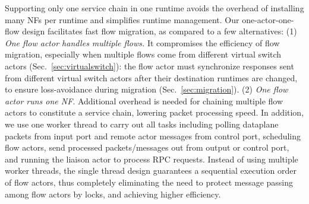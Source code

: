 




\vspace{1mm}
 Supporting only one service chain in one runtime avoids the overhead of installing many NFs per runtime and simplifies runtime management. Our one-actor-one-flow design facilitates fast flow migration, as compared to a few alternatives: (1) {\em One flow actor handles multiple flows.} It compromises the efficiency of flow migration, especially when multiple flows come from different virtual switch actors (Sec.~\ref{sec:virtualswitch}): the flow actor must synchronize responses sent from different virtual switch actors after their destination runtimes are changed, to ensure loss-avoidance during migration (Sec.~\ref{sec:migration}).
 (2) {\em One flow actor runs one NF}. Additional overhead is needed for chaining multiple flow actors to constitute a service chain, lowering packet processing speed. %
 In addition, we use one worker thread to carry out all tasks including polling dataplane packets from input port and remote actor messages from control port, scheduling flow actors, send processed packets/messages out from output or control port,
and running the liaison actor to process RPC requests. Instead of using multiple worker threads, the single thread design guarantees a sequential execution order of flow actors, thus completely eliminating the need to protect message passing among flow actors by locks, and achieving higher efficiency.




